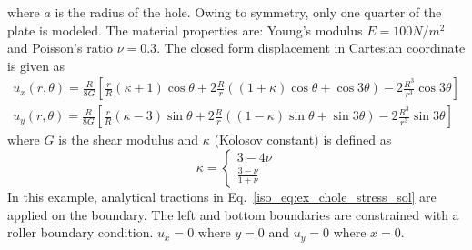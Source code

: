%
where $a$ is the radius of the hole.
Owing to symmetry, only one quarter of the plate is modeled.
The material properties are: Young’s modulus $E = 100 N/m^2$ and Poisson’s ratio $\nu = 0.3$.
The closed form displacement in Cartesian coordinate is given as
    \begin{subequations}
        \begin{align}
            u_x(r,\theta) = \frac{R}{8G} \left[
                \frac{r}{R} (\kappa + 1) \cos\theta +
                2 \frac{R}{r} \left(
                    (1+ \kappa ) \cos\theta +
                    \cos3\theta
                \right) -
                2 \frac{R^3}{r^3}\cos3\theta
            \right] \\
            u_y(r,\theta) = \frac{R}{8G} \left[
                \frac{r}{R} (\kappa -3) \sin\theta +
                2 \frac{R}{r} \left(
                    (1 - \kappa) \sin\theta +
                    \sin3\theta
                \right) -
                2 \frac{R^3}{r^3}\sin3\theta
            \right]
        \end{align}
    \label{iso_eq:ex_chole_disp_sol}
    \end{subequations}
%
where $G$ is the shear modulus and $\kappa$ (Kolosov constant) is defined as
    \begin{equation}
        \kappa = \left\{
            \begin{aligned}   
                3-4 \nu \\
                \frac{3- \nu }{1+ \nu }    
            \end{aligned}
        \right.
    \label{iso_eq:kolosov_constant}
    \end{equation}
%
In this example, analytical tractions in Eq.~\ref{iso_eq:ex_chole_stress_sol} are applied on the boundary.
The left and bottom boundaries are constrained with a roller boundary condition. $u_x=0$ where $y=0$ and $u_y=0$ where $x=0$.

